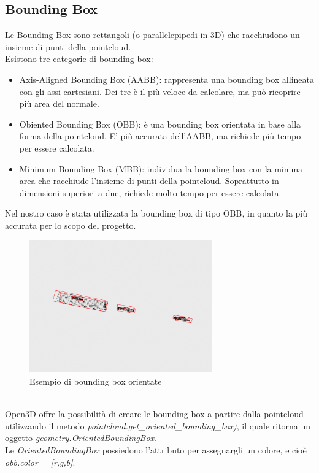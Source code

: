 \documentclass[italian]{report}
\begin{document}
\subsection{Bounding Box}
Le Bounding Box sono rettangoli (o parallelepipedi in 3D) che racchiudono un insieme di punti della pointcloud.\\
Esistono tre categorie di bounding box:
\begin{itemize}
	\item Axis-Aligned Bounding Box (AABB): rappresenta una bounding box allineata con gli assi cartesiani. Dei tre è il più veloce da calcolare, ma può ricoprire più area del normale.
	\item Obiented Bounding Box (OBB): è una bounding box orientata in base alla forma della pointcloud. E' più accurata dell'AABB, ma richiede più tempo per essere calcolata.
	\item Minimum Bounding Box (MBB): individua la bounding box con la minima area che racchiude l'insieme di punti della pointcloud. Soprattutto in dimensioni superiori a due, richiede molto tempo per essere calcolata.
\end{itemize}
Nel nostro caso è stata utilizzata la bounding box di tipo OBB, in quanto la più accurata per lo scopo del progetto.
\begin{figure}[H]
	\centering
	\includegraphics[width=0.7\textwidth]{bbox}
	\footnotesize
	\caption{Esempio di bounding box orientate}
\end{figure}\\
Open3D offre la possibilità di creare le bounding box a partire dalla pointcloud utilizzando il metodo \textit{pointcloud.get\_oriented\_bounding\_box)}, il quale ritorna un oggetto
\textit{geometry.OrientedBoundingBox}.\\
Le \textit{OrientedBoundingBox} possiedono l'attributo per assegnargli un colore, e cioè \textit{obb.color = [r,g,b]}.
\end{document}
